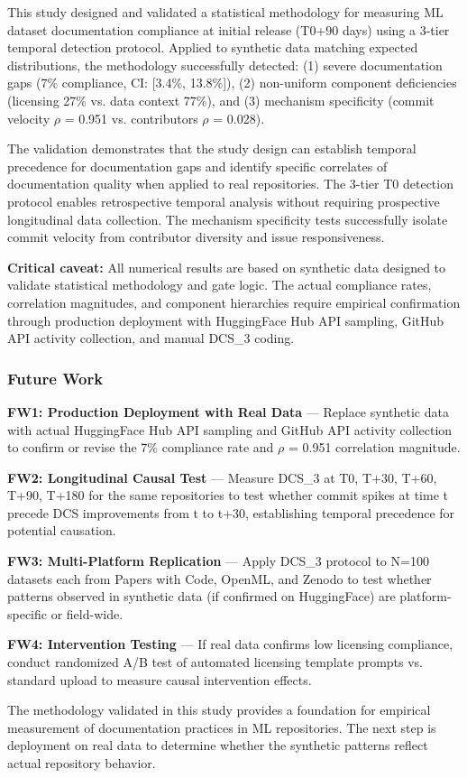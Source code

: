 
This study designed and validated a statistical methodology for measuring ML dataset documentation compliance at initial release (T0+90 days) using a 3-tier temporal detection protocol. Applied to synthetic data matching expected distributions, the methodology successfully detected: (1) severe documentation gaps (7\% compliance, CI: [3.4\%, 13.8\%]), (2) non-uniform component deficiencies (licensing 27\% vs. data context 77\%), and (3) mechanism specificity (commit velocity $\rho$ = 0.951 vs. contributors $\rho$ = 0.028).

The validation demonstrates that the study design can establish temporal precedence for documentation gaps and identify specific correlates of documentation quality when applied to real repositories. The 3-tier T0 detection protocol enables retrospective temporal analysis without requiring prospective longitudinal data collection. The mechanism specificity tests successfully isolate commit velocity from contributor diversity and issue responsiveness.

\textbf{Critical caveat:} All numerical results are based on synthetic data designed to validate statistical methodology and gate logic. The actual compliance rates, correlation magnitudes, and component hierarchies require empirical confirmation through production deployment with HuggingFace Hub API sampling, GitHub API activity collection, and manual DCS\_3 coding.

\subsubsection{Future Work}

\textbf{FW1: Production Deployment with Real Data} --- Replace synthetic data with actual HuggingFace Hub API sampling and GitHub API activity collection to confirm or revise the 7\% compliance rate and $\rho$ = 0.951 correlation magnitude.

\textbf{FW2: Longitudinal Causal Test} --- Measure DCS\_3 at T0, T+30, T+60, T+90, T+180 for the same repositories to test whether commit spikes at time t precede DCS improvements from t to t+30, establishing temporal precedence for potential causation.

\textbf{FW3: Multi-Platform Replication} --- Apply DCS\_3 protocol to N=100 datasets each from Papers with Code, OpenML, and Zenodo to test whether patterns observed in synthetic data (if confirmed on HuggingFace) are platform-specific or field-wide.

\textbf{FW4: Intervention Testing} --- If real data confirms low licensing compliance, conduct randomized A/B test of automated licensing template prompts vs. standard upload to measure causal intervention effects.

The methodology validated in this study provides a foundation for empirical measurement of documentation practices in ML repositories. The next step is deployment on real data to determine whether the synthetic patterns reflect actual repository behavior.
